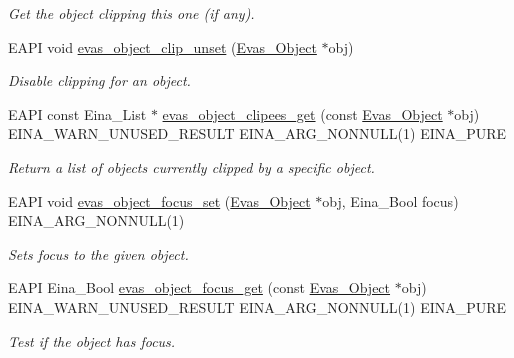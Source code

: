 \begin{DoxyCompactItemize}
\begin{DoxyCompactList}\small\item\em Get the object clipping this one (if any). \item\end{DoxyCompactList}\item 
EAPI void \hyperlink{group__Evas__Object__Group__Basic_gaa7fcd13f310444d7c1541b4fd31fa7f8}{evas\_\-object\_\-clip\_\-unset} (\hyperlink{group__Evas__Object__Group_ga9e19e6dd1f517a0ba437c0114d3e7c97}{Evas\_\-Object} $\ast$obj)
\begin{DoxyCompactList}\small\item\em Disable clipping for an object. \item\end{DoxyCompactList}\item 
EAPI const Eina\_\-List $\ast$ \hyperlink{group__Evas__Object__Group__Basic_gaa73ed804aa051d0aa5faa1743e113887}{evas\_\-object\_\-clipees\_\-get} (const \hyperlink{group__Evas__Object__Group_ga9e19e6dd1f517a0ba437c0114d3e7c97}{Evas\_\-Object} $\ast$obj) EINA\_\-WARN\_\-UNUSED\_\-RESULT EINA\_\-ARG\_\-NONNULL(1) EINA\_\-PURE
\begin{DoxyCompactList}\small\item\em Return a list of objects currently clipped by a specific object. \item\end{DoxyCompactList}\item 
EAPI void \hyperlink{group__Evas__Object__Group__Basic_ga5f1530901a9e94e3f35b987101009cf5}{evas\_\-object\_\-focus\_\-set} (\hyperlink{group__Evas__Object__Group_ga9e19e6dd1f517a0ba437c0114d3e7c97}{Evas\_\-Object} $\ast$obj, Eina\_\-Bool focus) EINA\_\-ARG\_\-NONNULL(1)
\begin{DoxyCompactList}\small\item\em Sets focus to the given object. \item\end{DoxyCompactList}\item 
EAPI Eina\_\-Bool \hyperlink{group__Evas__Object__Group__Basic_ga7dc71b30e4caaaf60076a5990173d654}{evas\_\-object\_\-focus\_\-get} (const \hyperlink{group__Evas__Object__Group_ga9e19e6dd1f517a0ba437c0114d3e7c97}{Evas\_\-Object} $\ast$obj) EINA\_\-WARN\_\-UNUSED\_\-RESULT EINA\_\-ARG\_\-NONNULL(1) EINA\_\-PURE
\begin{DoxyCompactList}\small\item\em Test if the object has focus. \item\end{DoxyCompactList}\item 

\end{DoxyCompactItemize}
